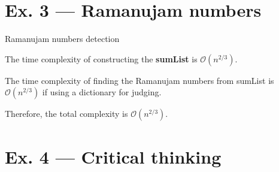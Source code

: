 \documentclass[12pt, a4paper]{article}
\begin{document}
\newpage
\section*{Ex. 3 --- Ramanujam numbers}
\begin{algorithm}[H]
    \caption{Ramanujam numbers detection}

\end{algorithm}

The time complexity of constructing the \textbf{sumList} is $\mathcal{O}(n^{2/3})$.

The time complexity of finding the Ramanujam numbers from sumList is $\mathcal{O}(n^{2/3})$ if using a dictionary for judging.

Therefore, the total complexity is $\mathcal{O}(n^{2/3})$.

\newpage
\section*{Ex. 4 --- Critical thinking}
\end{document}
